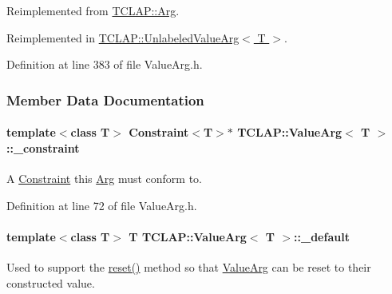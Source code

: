 Reimplemented from \hyperlink{classTCLAP_1_1Arg_aef8efaf3811162b2b2b2a84c6db280fa}{T\+C\+L\+A\+P\+::\+Arg}.



Reimplemented in \hyperlink{classTCLAP_1_1UnlabeledValueArg_abda4d1d695003ba165b6797e03007a99}{T\+C\+L\+A\+P\+::\+Unlabeled\+Value\+Arg$<$ T $>$}.



Definition at line 383 of file Value\+Arg.\+h.



\subsubsection{Member Data Documentation}
\paragraph[{\texorpdfstring{\+\_\+constraint}{_constraint}}]{\setlength{\rightskip}{0pt plus 5cm}template$<$class T$>$ {\bf Constraint}$<$T$>$$\ast$ {\bf T\+C\+L\+A\+P\+::\+Value\+Arg}$<$ T $>$\+::\+\_\+constraint\hspace{0.3cm}{\ttfamily [protected]}}\hypertarget{classTCLAP_1_1ValueArg_aa383908cff37688cf7493d46c840d03b}{}\label{classTCLAP_1_1ValueArg_aa383908cff37688cf7493d46c840d03b}
A \hyperlink{classTCLAP_1_1Constraint}{Constraint} this \hyperlink{classTCLAP_1_1Arg}{Arg} must conform to. 

Definition at line 72 of file Value\+Arg.\+h.

\paragraph[{\texorpdfstring{\+\_\+default}{_default}}]{\setlength{\rightskip}{0pt plus 5cm}template$<$class T$>$ T {\bf T\+C\+L\+A\+P\+::\+Value\+Arg}$<$ T $>$\+::\+\_\+default\hspace{0.3cm}{\ttfamily [protected]}}\hypertarget{classTCLAP_1_1ValueArg_a118e3a7932700a8e3626d8f9ee2e0c95}{}\label{classTCLAP_1_1ValueArg_a118e3a7932700a8e3626d8f9ee2e0c95}
Used to support the \hyperlink{classTCLAP_1_1ValueArg_a1bc480b71c4d8ac3646e796af8fb6e14}{reset()} method so that \hyperlink{classTCLAP_1_1ValueArg}{Value\+Arg} can be reset to their constructed value. 

